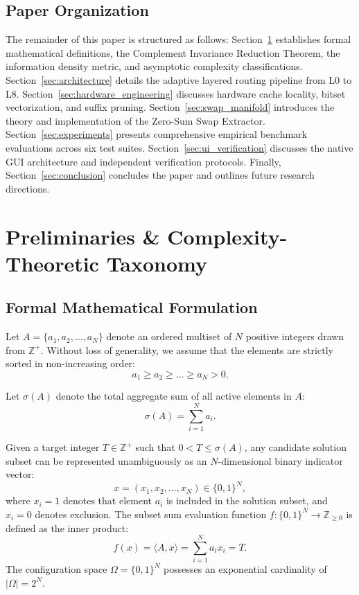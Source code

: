 \documentclass[journal,onecolumn,11pt]{IEEEtran}
\begin{document}
\subsection{Paper Organization}
The remainder of this paper is structured as follows: Section~\ref{sec:preliminaries} establishes formal mathematical definitions, the Complement Invariance Reduction Theorem, the information density metric, and asymptotic complexity classifications. Section~\ref{sec:architecture} details the adaptive layered routing pipeline from L0 to L8. Section~\ref{sec:hardware_engineering} discusses hardware cache locality, bitset vectorization, and suffix pruning. Section~\ref{sec:swap_manifold} introduces the theory and implementation of the Zero-Sum Swap Extractor. Section~\ref{sec:experiments} presents comprehensive empirical benchmark evaluations across six test suites. Section~\ref{sec:ui_verification} discusses the native GUI architecture and independent verification protocols. Finally, Section~\ref{sec:conclusion} concludes the paper and outlines future research directions.

\section{Preliminaries \& Complexity-Theoretic Taxonomy}
\label{sec:preliminaries}

\subsection{Formal Mathematical Formulation}
Let $A = \{a_1, a_2, \dots, a_N\}$ denote an ordered multiset of $N$ positive integers drawn from $\mathbb{Z}^+$. Without loss of generality, we assume that the elements are strictly sorted in non-increasing order:
\begin{equation}
    a_1 \ge a_2 \ge \dots \ge a_N > 0.
\end{equation}

Let $\sigma(A)$ denote the total aggregate sum of all active elements in $A$:
\begin{equation}
    \sigma(A) = \sum_{i=1}^N a_i.
\end{equation}

Given a target integer $T \in \mathbb{Z}^+$ such that $0 < T \le \sigma(A)$, any candidate solution subset can be represented unambiguously as an $N$-dimensional binary indicator vector:
\begin{equation}
    x = (x_1, x_2, \dots, x_N) \in \{0, 1\}^N,
\end{equation}
where $x_i = 1$ denotes that element $a_i$ is included in the solution subset, and $x_i = 0$ denotes exclusion. The subset sum evaluation function $f: \{0, 1\}^N \to \mathbb{Z}_{\ge 0}$ is defined as the inner product:
\begin{equation}
    f(x) = \langle A, x \rangle = \sum_{i=1}^N a_i x_i = T.
    \label{eq:indicator_formulation}
\end{equation}
The configuration space $\Omega = \{0, 1\}^N$ possesses an exponential cardinality of $|\Omega| = 2^N$.
\end{document}
